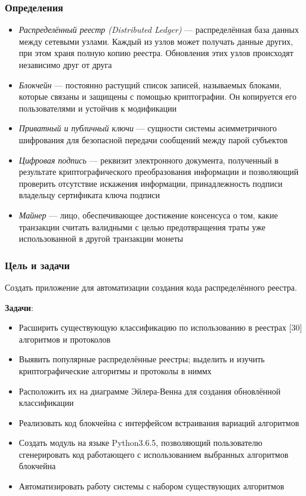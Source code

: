\documentclass{beamer}
\begin{document}
\begin{frame}
\frametitle{Определения}
\begin{itemize}
\small
    \item \emph{Распределённый реестр (Distributed Ledger)} --- распределённая база
          данных между сетевыми узлами. Каждый из узлов может получать данные
          других, при этом храня полную копию реестра.  Обновления этих
          узлов происходят независимо друг от друга
    \item \emph{Блокчейн} --- постоянно растущий список записей, называемых блоками,
          которые связаны и защищены с помощью криптографии. Он копируется его
          пользователями и устойчив к модификации
    \item \emph{Приватный и публичный ключи} --- сущности системы асимметричного
          шифрования для безопасной передачи сообщений между парой субъектов
    \item \emph{Цифровая подпись} --- реквизит электронного документа, полученный в
          результате криптографического преобразования информации и позволяющий
          проверить отсутствие искажения информации, принадлежность
          подписи владельцу сертификата ключа подписи
    \item \emph{Майнер} --- лицо, обеспечивающее достижение консенсуса о том,
          какие транзакции считать валидными с целью предотвращения траты уже
          использованной в другой транзакции монеты
\end{itemize}
\end{frame}

\begin{frame}[c]
    \small
    \frametitle{Цель и задачи}
    Создать приложение для автоматизации создания кода распределённого реестра.

    {\bfseries \color{HSEblue} Задачи}:
    \begin{itemize}
        \item Расширить существующую классификацию по использованию в реестрах
              [30] алгоритмов и протоколов
        \item Выявить популярные распределённые реестры; выделить и изучить
              криптографические алгоритмы и протоколы в ниммх
        \item Расположить их на диаграмме Эйлера-Венна для создания обновлённой
              классификации
        \item Реализовать код блокчейна с интерфейсом встраивания вариаций
              алгоритмов
        \item Создать модуль на языке Python3.6.5, позволяющий пользователю
              сгенерировать код работающего с использованием выбранных
              алгоритмов блокчейна
        \item Автоматизировать работу системы с набором существующих алгоритмов
    \end{itemize}
\end{frame}
\end{document}
